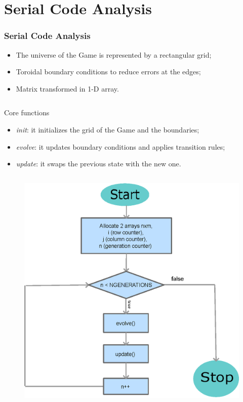 \documentclass{beamer}
\begin{document}
\section{Serial Code Analysis}
\begin{frame}
	\frametitle{Serial Code Analysis}
	\begin{minipage}{0.6\textwidth}
		\begin{itemize}
			\item The universe of the Game is represented by a rectangular grid;
			\item Toroidal boundary conditions to reduce errors at the edges;
			\item Matrix transformed in 1-D array.
		\end{itemize}
		\begin{columns}
			\begin{block}{Core functions}
				\begin{itemize}
					\item \textit{init}: it initializes the grid of the Game and the boundaries;\\
					\item \textit{evolve}: it updates boundary conditions and applies transition rules;\\
					\item \textit{update}: it swaps the previous state with the new one.
				\end{itemize}
			\end{block}
		\end{columns}
	\end{minipage}%
	\begin{minipage}{0.4\textwidth}
		\begin{figure}
			\centering
			\includegraphics[width=\linewidth]{../report/chart.eps}
		\end{figure}
	\end{minipage}
\end{frame}
\end{document}
